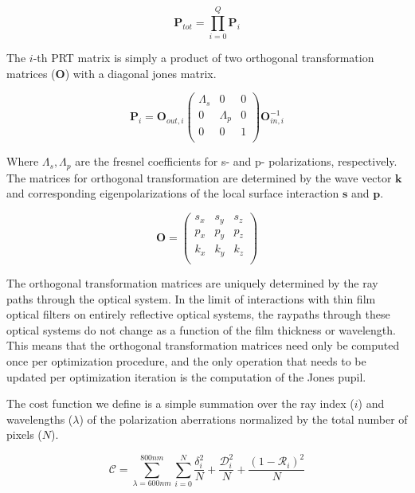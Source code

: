 \begin{equation}
    \mathbf{P}_{tot} = \prod_{i=0}^{Q} \mathbf{P}_{i}
    \label{eq:prt_prod}
\end{equation}

The $i$-th PRT matrix is simply a product of two orthogonal transformation matrices ($\mathbf{O}$) with a diagonal jones matrix.

\begin{equation}
    \mathbf{P}_{i} = \mathbf{O}_{out,i} 
    \begin{pmatrix}
        \Lambda_{s} & 0 & 0 \\
        0 & \Lambda_{p} & 0 \\
        0 & 0 & 1 \\
    \end{pmatrix}
    \mathbf{O}_{in,i}^{-1}
\end{equation}

Where $\Lambda_{s},\Lambda_{p}$ are the fresnel coefficients for s- and p- polarizations, respectively. The matrices for orthogonal transformation are determined by the wave vector $\mathbf{k}$ and corresponding eigenpolarizations of the local surface interaction $\mathbf{s}$ and $\mathbf{p}$.

\begin{equation}
    \mathbf{O} = 
    \begin{pmatrix}
        s_{x} & s_{y} & s_{z} \\
        p_{x} & p_{y} & p_{z} \\
        k_{x} & k_{y} & k_{z} \\
    \end{pmatrix}
\end{equation}

The orthogonal transformation matrices are uniquely determined by the ray paths through the optical system. In the limit of interactions with thin film optical filters on entirely reflective optical systems, the raypaths through these optical systems do not change as a function of the film thickness or wavelength. This means that the orthogonal transformation matrices need only be computed once per optimization procedure, and the only operation that needs to be updated per optimization iteration is the computation of the Jones pupil.

The cost function we define is a simple summation over the ray index ($i$) and wavelengths ($\lambda$) of the polarization aberrations normalized by the total number of pixels ($N$). 

\begin{equation}
    \mathcal{C} = \sum_{\lambda = 600nm}^{800nm} \sum_{i=0}^{N} \frac{\delta_{i}^{2}}{N} + \frac{\mathcal{D}_{i}^{2}}{N} + \frac{(1-\mathcal{R}_{i})^{2}}{N}
\end{equation}





